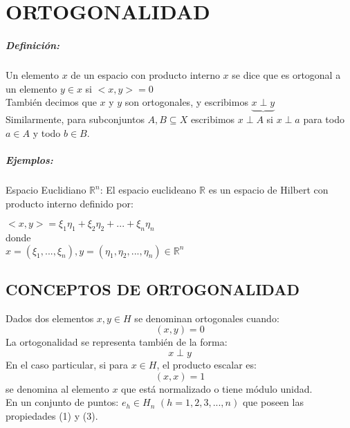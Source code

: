 \section{ORTOGONALIDAD}

\subparagraph{Definición:} Un elemento $x$ de un espacio con producto interno $x$ se dice que es ortogonal a un elemento $y \in x$ si $<x, y> = 0$ \\

También decimos que $x$ y $y$ son ortogonales, y escribimos $\underbrace{x \perp y}$\\

Similarmente, para subconjuntos $A, B \subseteq X$ escribimos $x \perp A$ si $x \perp a$ para todo $a \in A$ y todo $b \in B$.
\subparagraph{Ejemplos:}
Espacio Euclidiano  $ \mathbb{R}^{n} $: El espacio euclideano  $ \mathbb{R}$ es un espacio de Hilbert con producto interno definido por:

		$ <x, y> = \xi_{1} \eta_{1} + \xi_{2} \eta_{2} +  ... + \xi_{n} \eta_{n} $\\
		donde\\
		$x = (\xi_{1}, ..., \xi_{n}), y = (\eta_{1}, \eta_{2}, ..., \eta_{n}) \in \mathbb{R}^{n} $\\
		
		\setcounter{equation}{0}
		
	\subsection{CONCEPTOS DE ORTOGONALIDAD}
	
	Dados dos elementos $ x, y \in H $ se denominan ortogonales cuando: 
	\begin{equation}
	(x, y) = 0                                                                 
	\end{equation} 
	La ortogonalidad se representa también de la forma:
	\begin{equation}
		x \perp y
	\end{equation}   
	En el caso particular, si para $ x \in H $, el producto escalar es:
	\begin{equation}
		(x, x) = 1
	\end{equation}
	se denomina al elemento $ x $ que está normalizado o tiene módulo unidad.\\
	
	En un conjunto de puntos: $ e_{h} \in H_{n} $ $ (h = 1, 2, 3, ..., n) $ que poseen las propiedades (1) y (3).
	

